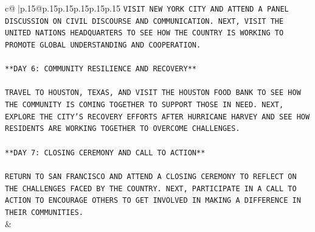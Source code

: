 \documentclass{article}
\begin{document}
{\begin{supertabular}{c@{$\;$}|p{.15\linewidth}@{}p{.15\linewidth}p{.15\linewidth}p{.15\linewidth}p{.15\linewidth}p{.15\linewidth}}
{{{\texttt{VISIT NEW YORK CITY AND ATTEND A PANEL DISCUSSION ON CIVIL DISCOURSE AND COMMUNICATION. NEXT, VISIT THE UNITED NATIONS HEADQUARTERS TO SEE HOW THE COUNTRY IS WORKING TO PROMOTE GLOBAL UNDERSTANDING AND COOPERATION.} \\
\\ 
\texttt{**DAY 6: COMMUNITY RESILIENCE AND RECOVERY**} \\
\\ 
\texttt{TRAVEL TO HOUSTON, TEXAS, AND VISIT THE HOUSTON FOOD BANK TO SEE HOW THE COMMUNITY IS COMING TOGETHER TO SUPPORT THOSE IN NEED. NEXT, EXPLORE THE CITY'S RECOVERY EFFORTS AFTER HURRICANE HARVEY AND SEE HOW RESIDENTS ARE WORKING TOGETHER TO OVERCOME CHALLENGES.} \\
\\ 
\texttt{**DAY 7: CLOSING CEREMONY AND CALL TO ACTION**} \\
\\ 
\texttt{RETURN TO SAN FRANCISCO AND ATTEND A CLOSING CEREMONY TO REFLECT ON THE CHALLENGES FACED BY THE COUNTRY. NEXT, PARTICIPATE IN A CALL TO ACTION TO ENCOURAGE OTHERS TO GET INVOLVED IN MAKING A DIFFERENCE IN THEIR COMMUNITIES.} \\
            }
        }
    }
    & \\ \\


\end{supertabular}}
\end{document}
